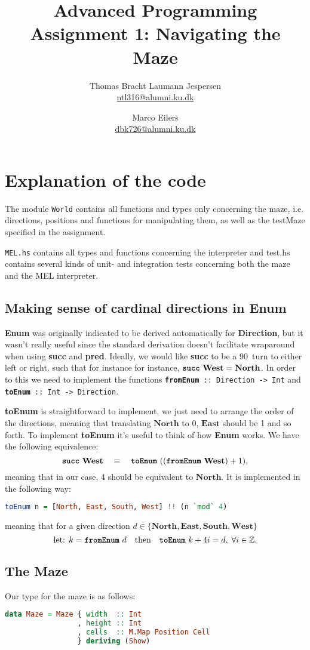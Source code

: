 \documentclass[a4paper]{article}
\title{Advanced Programming\\
Assignment 1: Navigating the Maze}
\author{Thomas Bracht Laumann Jespersen\\ \url{ntl316@alumni.ku.dk} \and Marco Eilers\\ \url{dbk726@alumni.ku.dk} }
\newcommand{\west}{\ensuremath{\textbf{West}}\xspace}
\newcommand{\east}{\ensuremath{\textbf{East}}\xspace}
\newcommand{\south}{\ensuremath{\textbf{South}}\xspace}
\newcommand{\north}{\ensuremath{\textbf{North}}\xspace}
\newcommand{\suc}{\textbf{\ttfamily succ}\xspace}
\newcommand{\prd}{\textbf{\ttfamily pred}\xspace}
\newcommand{\src}[1]{\texttt{#1}\xspace}
\newcommand{\func}[1]{\textbf{\ttfamily #1}\xspace}
\newcommand{\functype}[2]{\mbox{\texttt{\scriptsize\textbf{#1} ::\ #2}}\xspace}
\begin{document}
\maketitle


\section{Explanation of the code}
The module \src{World} contains all functions and types only concerning the maze, i.e. directions, positions and functions for manipulating them, as well as the testMaze specified in the assignment. 

\src{MEL.hs} contains all types and functions concerning the interpreter and test.hs contains several kinds of unit- and integration tests concerning both the maze and the MEL interpreter.

\subsection{Making sense of cardinal directions in \func{Enum}}
\func{Enum} was originally indicated to be derived automatically for \func{Direction}, but it wasn't really useful since the standard derivation doesn't facilitate wraparound when using \suc and \prd. Ideally, we would like \suc to be a 90\textdegree\ turn to either left or right, such that for instance for instance, $\text{\suc\ }\west = \north$. In order to this we need to implement the functions \functype{fromEnum}{Direction -> Int} and \functype{toEnum}{Int -> Direction}.

\func{toEnum} is straightforward to implement, we just need to arrange the order of the directions, meaning that translating \north to 0, \east should be 1 and so forth. To implement \func{toEnum} it's useful to think of how \func{Enum} works. We have the following equivalence:
\[
\text{\suc\ } \west\quad\equiv\quad\text{\func{toEnum} } ((\text{\func{fromEnum} } \west) + 1),
\]
meaning that in our case, 4 should be equivalent to \north. It is implemented in the following way:
\begin{lstlisting}[language=haskell]
  toEnum n = [North, East, South, West] !! (n `mod` 4)
\end{lstlisting}
meaning that for a given direction $d\in\{\north,\east,\south,\west \}$
\[
\text{let: } k = \text{\func{fromEnum} } d\quad\text{then}\quad\text{\func{toEnum} } k + 4i = d,\;\forall i\in\mathbb{Z}.
\]

\subsection{The Maze}
Our type for the maze is as follows:
\begin{lstlisting}[language=haskell]
data Maze = Maze { width  :: Int
                 , height :: Int
                 , cells  :: M.Map Position Cell
                 } deriving (Show)
\end{lstlisting}
\end{document}
